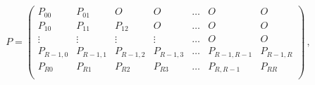 \begin{gather*}


P=


\begin{pmatrix}


P_{00}    & P_{01}    & O         & O         & \ldots & O           & O\\


P_{10}    & P_{11}    & P_{12}    & O         & \ldots & O           & O\\


\vdots    & \vdots    & \vdots    & \vdots    & \ldots & O           & O\\


P_{R-1,0} & P_{R-1,1} & P_{R-1,2} & P_{R-1,3} & \ldots & P_{R-1,R-1} & P_{R-1,R}\\


P_{R0}    & P_{R1}    & P_{R2}    & P_{R3}    & \ldots & P_{R,R-1}   & P_{RR}\\


\end{pmatrix}\,,


\end{gather*}





